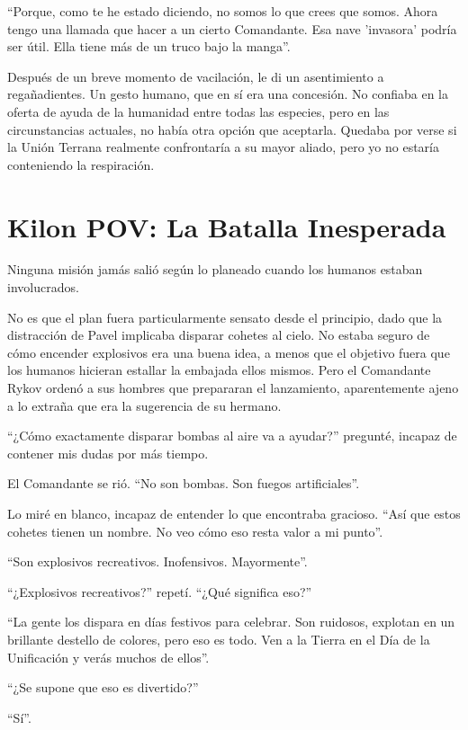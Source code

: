 \documentclass[spanish,12pt,a4paper,oneside,titlepage]{book}
\begin{document}
    ``Porque, como te he estado diciendo, no somos lo que crees que somos. Ahora tengo una llamada que hacer a un cierto Comandante. Esa nave 'invasora' podría ser útil. Ella tiene más de un truco bajo la manga''.

    Después de un breve momento de vacilación, le di un asentimiento a regañadientes. Un gesto humano, que en sí era una concesión. No confiaba en la oferta de ayuda de la humanidad entre todas las especies, pero en las circunstancias actuales, no había otra opción que aceptarla. Quedaba por verse si la Unión Terrana realmente confrontaría a su mayor aliado, pero yo no estaría conteniendo la respiración.

    \chapter{Kilon POV: La Batalla Inesperada}

    Ninguna misión jamás salió según lo planeado cuando los humanos estaban involucrados.

    No es que el plan fuera particularmente sensato desde el principio, dado que la distracción de Pavel implicaba disparar cohetes al cielo. No estaba seguro de cómo encender explosivos era una buena idea, a menos que el objetivo fuera que los humanos hicieran estallar la embajada ellos mismos. Pero el Comandante Rykov ordenó a sus hombres que prepararan el lanzamiento, aparentemente ajeno a lo extraña que era la sugerencia de su hermano.

    ``¿Cómo exactamente disparar bombas al aire va a ayudar?'' pregunté, incapaz de contener mis dudas por más tiempo.

    El Comandante se rió. ``No son bombas. Son fuegos artificiales''.

    Lo miré en blanco, incapaz de entender lo que encontraba gracioso. ``Así que estos cohetes tienen un nombre. No veo cómo eso resta valor a mi punto''.

    ``Son explosivos recreativos. Inofensivos. Mayormente''.

    ``¿Explosivos recreativos?'' repetí. ``¿Qué significa eso?''

    ``La gente los dispara en días festivos para celebrar. Son ruidosos, explotan en un brillante destello de colores, pero eso es todo. Ven a la Tierra en el Día de la Unificación y verás muchos de ellos''.

    ``¿Se supone que eso es divertido?''

    ``Sí''.
\end{document}

